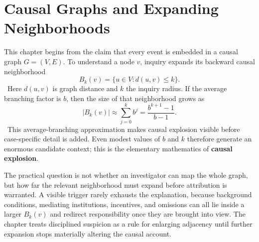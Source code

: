 
\chapter{Causal Graphs and Expanding Neighborhoods}
\label{ch:ch011}

This chapter begins from the claim that every event is embedded in a causal graph \(G=(V,E)\). To understand a node \(v\), inquiry expands its backward causal neighborhood
\[
B_k(v)=\{u\in V:d(u,v)\leq k\}.
\]
\Definition\ Here \(d(u,v)\) is graph distance and \(k\) the inquiry radius.
If the average branching factor is \(b\), then the size of that neighborhood grows as
\[
|B_k(v)|
\approx
\sum_{j=0}^{k}b^j
=
\frac{b^{k+1}-1}{b-1}.
\]
\ToyModel\ This average-branching approximation makes causal explosion visible before case-specific detail is added.
Even modest values of \(b\) and \(k\) therefore generate an enormous candidate context; this is the elementary mathematics of \textbf{causal explosion}.

The practical question is not whether an investigator can map the whole graph, but how far the relevant neighborhood must expand before attribution is warranted. A visible trigger rarely exhausts the explanation, because background conditions, mediating institutions, incentives, and omissions can all lie inside a larger \(B_k(v)\) and redirect responsibility once they are brought into view. The chapter treats disciplined suspicion as a rule for enlarging adjacency until further expansion stops materially altering the causal account.
